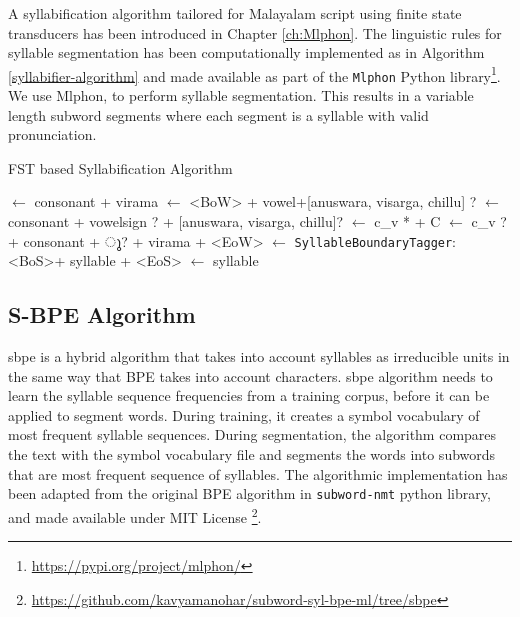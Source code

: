 A syllabification algorithm tailored for Malayalam script using finite state
transducers has been introduced in Chapter \ref{ch:Mlphon}. The linguistic rules
for syllable segmentation has been computationally implemented as in Algorithm
\ref{syllabifier-algorithm} and made available as part of the \texttt{Mlphon}
Python library\footnote{\url{https://pypi.org/project/mlphon/}}. We use
Mlphon, to perform syllable segmentation. This results in a variable
length subword segments where each segment is a syllable with valid pronunciation.

\begin{algorithm*}[ht]
    \caption{FST based Syllabification Algorithm}\label{syllabifier-algorithm}
    \begin{algorithmic}[1]
         $\gets$ {\ipa consonant + virama}
         $\gets$ {\ipa <BoW> + vowel+[anuswara, visarga, chillu] ?}  
         $\gets$ {\ipa consonant + vowelsign ? + [anuswara, visarga, chillu]?}
         $\gets$ {\ipa c\_v * + C} 
         $\gets$ {\ipa c\_v ? + consonant + {\mal ു}? + virama + <EoW>}
         $\gets$ {} 
        \State \texttt{SyllableBoundaryTagger}: {\ipa <BoS>+ syllable +  <EoS>} $\gets$ {\ipa syllable}
        \EndProcedure
    \end{algorithmic}
\end{algorithm*}






\subsection{S-BPE Algorithm}

\gls{sbpe} is a hybrid algorithm that takes into account syllables as irreducible
units in the same way that BPE takes into account characters. \gls{sbpe} algorithm
needs to learn the syllable sequence frequencies from a training corpus, before
it can be applied to segment words. During training, it creates a symbol
vocabulary of most frequent syllable sequences. During segmentation, the
algorithm compares the text with the symbol vocabulary file and segments the
words into subwords that are most frequent sequence of syllables. The
algorithmic implementation has been adapted from the original BPE algorithm in
\texttt{subword-nmt} python library, and made available under MIT License
\footnote{{\url{https://github.com/kavyamanohar/subword-syl-bpe-ml/tree/sbpe}}}.

